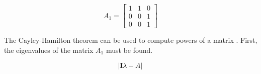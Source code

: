 \begin{question}{4} %
\begin{equation}
A_1 = 
\begin{bmatrix} 
  1 & 1 & 0 \\ 
  0 & 0 & 1 \\
  0 & 0 & 1
\end{bmatrix} \nonumber
\end{equation}
\end{question}

The Cayley-Hamilton theorem can be used to compute powers of a matrix 
\cite{chen1998linear}. First, the eigenvalues of the matrix $A_1$ must be found.

\begin{align}
\abs{\mathbf{I}\lambda - A}
\end{align}

